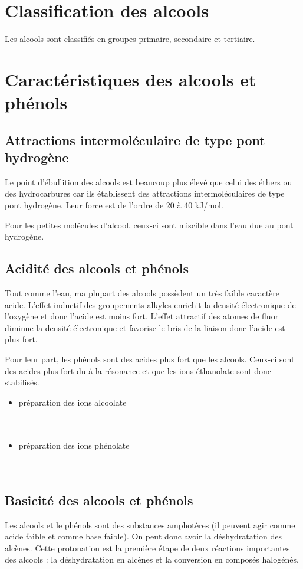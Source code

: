 \section{Classification des alcools}

Les alcools sont classifiés en groupes primaire, secondaire et tertiaire.

\section{Caractéristiques des alcools et phénols}
\subsection{Attractions intermoléculaire de type pont hydrogène}
Le point d'ébullition des alcools est beaucoup plus élevé que celui des éthers ou des hydrocarbures car ils établissent des attractions intermoléculaires de type pont hydrogène.
Leur force est de l'ordre de 20 à 40 kJ/mol.

Pour les petites molécules d'alcool, ceux-ci sont miscible dans l'eau due au pont hydrogène.

\subsection{Acidité des alcools et phénols}
Tout comme l'eau, ma plupart des alcools possèdent un très faible caractère acide.
L'effet inductif des groupements alkyles enrichit la densité électronique de l'oxygène et donc l'acide est moins fort.
L'effet attractif  des atomes de fluor diminue la densité électronique et favorise le bris de la liaison donc l'acide est plus fort.

Pour leur part, les phénols sont des acides plus fort que les alcools.
Ceux-ci sont des acides plus fort du à la résonance et que les ions éthanolate sont donc stabilisés.

\begin{itemize}
  \item préparation des ions alcoolate \\
    \\
    \\
  \item préparation des ions phénolate\\
    \\
    \\
\end{itemize}

\subsection{Basicité des alcools et phénols}
Les alcools et le phénols sont des substances amphotères (il peuvent agir comme acide faible et comme base faible).
On peut donc avoir la déshydratation des alcènes.
Cette protonation est la première étape de deux réactions importantes des alcools : la déshydratation en alcènes et la conversion en composés halogénés.

